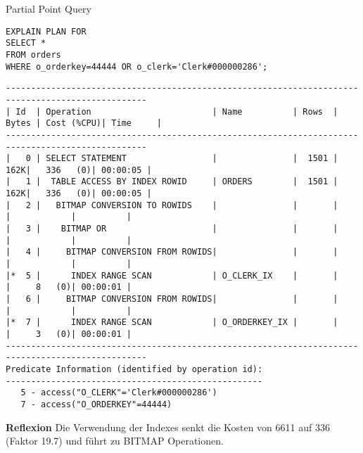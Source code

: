 \documentclass[10pt]{article}
\begin{document}
Partial Point Query
\begin{lstlisting}[style=sql]
EXPLAIN PLAN FOR
SELECT *
FROM orders
WHERE o_orderkey=44444 OR o_clerk='Clerk#000000286';
\end{lstlisting}
\begin{lstlisting}[style=queryexecutionplan]
--------------------------------------------------------------------------------------------------
| Id  | Operation                        | Name          | Rows  | Bytes | Cost (%CPU)| Time     |
--------------------------------------------------------------------------------------------------
|   0 | SELECT STATEMENT                 |               |  1501 |   162K|   336   (0)| 00:00:05 |
|   1 |  TABLE ACCESS BY INDEX ROWID     | ORDERS        |  1501 |   162K|   336   (0)| 00:00:05 |
|   2 |   BITMAP CONVERSION TO ROWIDS    |               |       |       |            |          |
|   3 |    BITMAP OR                     |               |       |       |            |          |
|   4 |     BITMAP CONVERSION FROM ROWIDS|               |       |       |            |          |
|*  5 |      INDEX RANGE SCAN            | O_CLERK_IX    |       |       |     8   (0)| 00:00:01 |
|   6 |     BITMAP CONVERSION FROM ROWIDS|               |       |       |            |          |
|*  7 |      INDEX RANGE SCAN            | O_ORDERKEY_IX |       |       |     3   (0)| 00:00:01 |
--------------------------------------------------------------------------------------------------
Predicate Information (identified by operation id):
---------------------------------------------------
   5 - access("O_CLERK"='Clerk#000000286')
   7 - access("O_ORDERKEY"=44444)
\end{lstlisting}
\textbf{Reflexion} \newline
Die Verwendung der Indexes senkt die Kosten von 6611 auf 336 (Faktor 19.7) und führt zu BITMAP Operationen.
\end{document}

